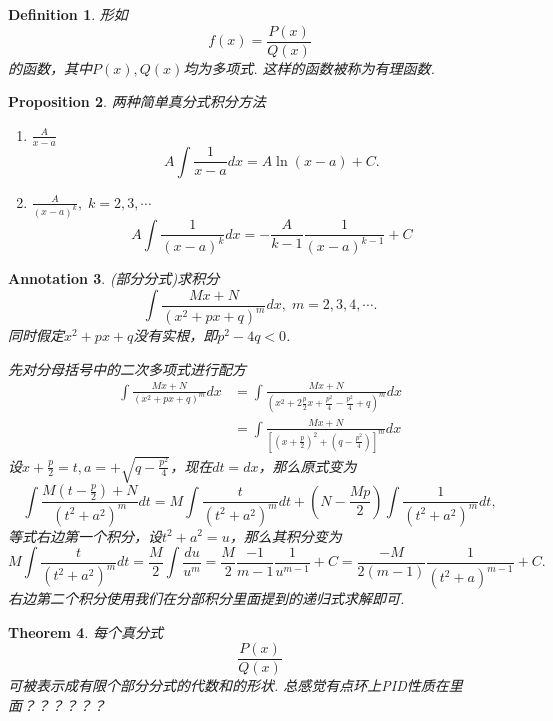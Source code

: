 \documentclass{article}
\newtheorem{theorem}{Theorem}[section]
\newtheorem{proposition}[theorem]{Proposition}
\newtheorem{definition}[theorem]{Definition}
\newtheorem{annotation}[theorem]{Annotation}
\begin{document}
\begin{definition}
\rm 形如
$$
f(x)=\frac{P(x)}{Q(x)}
$$
的函数，其中$P(x),Q(x)$均为多项式. 这样的函数被称为{\color{red}有理函数}.
\end{definition}

\begin{proposition}
\rm 两种{\color{red}简单真分式}积分方法
\begin{enumerate}
	\item $\frac{A}{x-a}$
	$$
	A\int \frac{1}{x-a}dx = A \ln(x-a) + C.
	$$
	\item $\frac{A}{(x-a)^k},\; k = 2,3,\cdots$
	$$
	A\int \frac{1}{(x-a)^k}dx = -\frac{A}{k-1}\frac{1}{(x-a)^{k-1}} + C
	$$
\end{enumerate}
\end{proposition}

\begin{annotation}
\rm {\color{red}(部分分式)}求积分
$$
\int \frac{Mx+N}{(x^2+px+q)^m}dx,\; m = 2,3,4,\cdots.
$$
同时假定$x^2+px+q$没有实根，即$p^2 - 4q < 0$.

先对分母括号中的二次多项式进行配方
$$
\begin{array}{ll}
\int \frac{Mx+N}{(x^2+px+q)^m}dx &= \int \frac{Mx+N}{(x^2+2\frac{p}{2}x+\frac{p^2}{4}-\frac{p^2}{4}+q)^m}dx\\
&= \int \frac{Mx+N}{\left[(x+\frac{p}{2})^2+(q-\frac{p^2}{4})\right]^m}dx
\end{array}
$$
设$x+\frac{p}{2} = t, a = + \sqrt{q-\frac{p^2}{4}}$，现在$dt=dx$，那么原式变为
$$
\int \frac{M(t-\frac{p}{2})+N}{\left(t^2+a^2\right)^m}dt = M\int \frac{t}{\left(t^2+a^2\right)^m}dt + (N-\frac{Mp}{2})\int \frac{1}{\left(t^2+a^2\right)^m}dt,
$$
等式右边第一个积分，设$t^2+a^2 = u$，那么其积分变为
$$
M\int \frac{t}{\left(t^2+a^2\right)^m}dt = \frac{M}{2} \int  \frac{du}{u^m} = \frac{M}{2} \frac{-1}{m-1}\frac{1}{u^{m-1}} + C = \frac{-M}{2(m-1)}\frac{1}{(t^2+a)^{m-1}}+C.
$$
右边第二个积分使用我们在分部积分里面提到的{\color{blue}递归式求解}即可. 
\end{annotation}

\begin{theorem}
\rm 每个真分式
$$
\frac{P(x)}{Q(x)}
$$
可被表示成{\color{red}有限个部分分式的代数和}的形状. {\color{blue}总感觉有点环上PID性质在里面？？？？？？}
\end{theorem}
\end{document}
